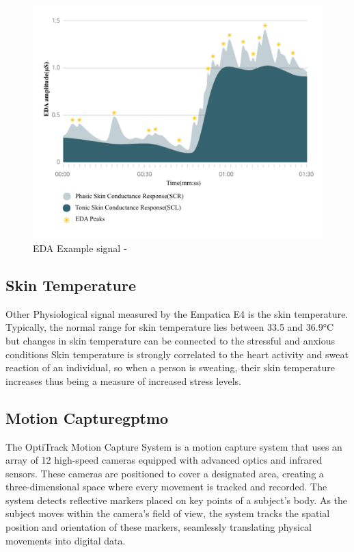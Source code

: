 \begin{figure}[!htbp]
	\centering
	\includegraphics[width=0.8\columnwidth]{images/eda.pdf}
	\caption{EDA Example signal - \parencite{eda}}
	\label{fig:eda sig}
\end{figure}

\subsection*{Skin Temperature }
Other Physiological signal measured by the Empatica E4 is the skin temperature. Typically, the normal range for skin temperature lies between 33.5 and 36.9°C but changes in skin temperature can be connected to the stressful and anxious conditions \parencite{emp2}
Skin temperature is strongly correlated to the heart activity and sweat reaction of an individual, so when a person is sweating, their skin temperature increases thus being a measure of increased stress levels.


\subsection{Motion Capture\gls{gptmo}}
\label{subsec:mocap}
The OptiTrack Motion Capture System is a motion capture system that uses an array of 12 high-speed cameras equipped with advanced optics and infrared sensors. These cameras are positioned to cover a designated area, creating a three-dimensional space where every movement is tracked and recorded. The system detects reflective markers placed on key points of a subject's body. As the subject moves within the camera's field of view, the system tracks the spatial position and orientation of these markers, seamlessly translating physical movements into digital data. 

